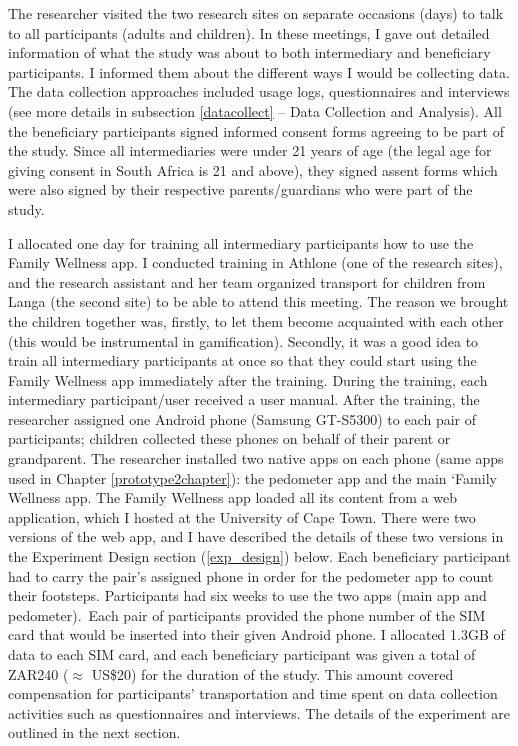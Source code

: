 The researcher visited the two research sites on separate occasions (days) to talk to all participants (adults and children). In these meetings, I gave out detailed information of what the study was about to both intermediary and beneficiary participants. I informed them about the different ways I would be collecting data. The data collection approaches included usage logs, questionnaires and interviews (see more details in subsection \ref{datacollect} -- Data Collection and Analysis). All the beneficiary participants signed informed consent forms agreeing to be part of the study. Since all intermediaries were under 21 years of age (the legal age for giving consent in South Africa is 21 and above), they signed assent forms which were also signed by their respective parents/guardians who were part of the study.

I allocated one day for training all intermediary participants how to use the Family Wellness app. I conducted training in Athlone (one of the research sites), and the research assistant and her team organized transport for children from Langa (the second site) to be able to attend this meeting. The reason we brought the children together was, firstly, to let them become acquainted with each other (this would be instrumental in gamification). Secondly, it was a good idea to train all intermediary participants at once so that they could start using the Family Wellness app immediately after the training. During the training, each intermediary participant/user received a user manual. After the training, the researcher assigned one Android phone (Samsung GT-S5300) to each pair of participants; children collected these phones on behalf of their parent or grandparent. The researcher installed two native apps on each phone (same apps used in Chapter \ref{prototype2chapter}): the pedometer app and the main `Family Wellness app. The Family Wellness app loaded all its content from a web application, which I hosted at the University of Cape Town. There were two versions of the web app, and I have described the details of these two versions in the Experiment Design section (\ref{exp_design}) below. Each beneficiary participant had to carry the  pair's assigned phone in order for the pedometer app to count their footsteps. Participants had six weeks to use the two apps (main app and pedometer).~Each pair of participants provided the phone number of the SIM card that would be inserted into their given Android phone. I allocated 1.3GB of data to each SIM card, and each beneficiary participant was given a total of ZAR240 ($\approx$ US\$20) for the duration of the study. This amount covered compensation for participants' transportation and time spent on data collection activities such as questionnaires and interviews. The details of the experiment are outlined in the next section. 

